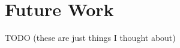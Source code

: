 \documentclass[twocolumn]{article}
\begin{document}
    
    




\section{Future Work}
TODO (these are just things I thought about)
\end{document}
